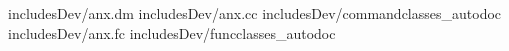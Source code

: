 \documentclass[10pt, bibtotoc, pointlessnumbers, twoside=false, normalheadings]{scrbook}
\begin{document}





\begin{appendix} 
 {includesDev/anx.dm}
 {includesDev/anx.cc}
 {includesDev/commandclasses_autodoc}
 {includesDev/anx.fc}
 {includesDev/funcclasses_autodoc}
 
\end{appendix} 

\listoftables
\listoffigures
\printindex
\end{document}
